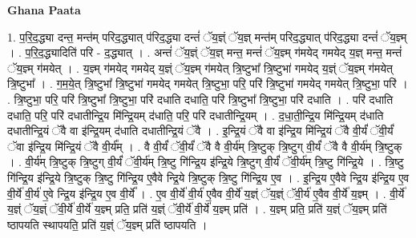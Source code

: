 \documentclass[17pt]{extarticle}
\begin{document}
\textbf{Ghana Paata } \newline

1. प॒रि॒द॒द्ध्या दन्त॒ मन्त॑म् परिद॒द्ध्यात् प॑रिद॒द्ध्या दन्तं॑ ॅय॒ज्ञ्ं ॅय॒ज्ञ् मन्त॑म् परिद॒द्ध्यात् प॑रिद॒द्ध्या दन्तं॑ ॅय॒ज्ञ्म् । . प॒रि॒द॒द्ध्यादिति॑ परि - द॒द्ध्यात् । . अन्तं॑ ॅय॒ज्ञ्ं ॅय॒ज्ञ् मन्त॒ मन्तं॑ ॅय॒ज्ञ्म् ग॑मयेद् गमयेद् य॒ज्ञ् मन्त॒ मन्तं॑ ॅय॒ज्ञ्म् ग॑मयेत् । . य॒ज्ञ्म् ग॑मयेद् गमयेद् य॒ज्ञ्ं ॅय॒ज्ञ्म् ग॑मयेत् त्रि॒ष्टुभा᳚ त्रि॒ष्टुभा॑ गमयेद् य॒ज्ञ्ं ॅय॒ज्ञ्म् ग॑मयेत् त्रि॒ष्टुभा᳚ । . ग॒म॒ये॒त् त्रि॒ष्टुभा᳚ त्रि॒ष्टुभा॑ गमयेद् गमयेत् त्रि॒ष्टुभा॒ परि॒ परि॑ त्रि॒ष्टुभा॑ गमयेद् गमयेत् त्रि॒ष्टुभा॒ परि॑ । . त्रि॒ष्टुभा॒ परि॒ परि॑ त्रि॒ष्टुभा᳚ त्रि॒ष्टुभा॒ परि॑ दधाति दधाति॒ परि॑ त्रि॒ष्टुभा᳚ त्रि॒ष्टुभा॒ परि॑ दधाति । . परि॑ दधाति दधाति॒ परि॒ परि॑ दधातीन्द्रि॒य मि॑न्द्रि॒यम् द॑धाति॒ परि॒ परि॑ दधातीन्द्रि॒यम् । . द॒धा॒ती॒न्द्रि॒य मि॑न्द्रि॒यम् द॑धाति दधातीन्द्रि॒यं ॅवै वा इ॑न्द्रि॒यम् द॑धाति दधातीन्द्रि॒यं ॅवै । . इ॒न्द्रि॒यं ॅवै वा इ॑न्द्रि॒य मि॑न्द्रि॒यं ॅवै वी॒र्यं॑ ॅवी॒र्यं॑ ॅवा इ॑न्द्रि॒य मि॑न्द्रि॒यं ॅवै वी॒र्य᳚म् । . वै वी॒र्यं॑ ॅवी॒र्यं॑ ॅवै वै वी॒र्य॑म् त्रि॒ष्टुक् त्रि॒ष्टुग् वी॒र्यं॑ ॅवै वै वी॒र्य॑म् त्रि॒ष्टुक् । . वी॒र्य॑म् त्रि॒ष्टुक् त्रि॒ष्टुग् वी॒र्यं॑ ॅवी॒र्य॑म् त्रि॒ष्टु गि॑न्द्रि॒य इ॑न्द्रि॒ये त्रि॒ष्टुग् वी॒र्यं॑ ॅवी॒र्य॑म् त्रि॒ष्टु गि॑न्द्रि॒ये । . त्रि॒ष्टु गि॑न्द्रि॒य इ॑न्द्रि॒ये त्रि॒ष्टुक् त्रि॒ष्टु गि॑न्द्रि॒य ए॒वैवे न्द्रि॒ये त्रि॒ष्टुक् त्रि॒ष्टु गि॑न्द्रि॒य ए॒व । . इ॒न्द्रि॒य ए॒वैवे न्द्रि॒य इ॑न्द्रि॒य ए॒व वी॒र्ये॑ वी॒र्य॑ ए॒वे न्द्रि॒य इ॑न्द्रि॒य ए॒व वी॒र्ये᳚ । . ए॒व वी॒र्ये॑ वी॒र्य॑ ए॒वैव वी॒र्ये॑ य॒ज्ञ्ं ॅय॒ज्ञ्ं ॅवी॒र्य॑ ए॒वैव वी॒र्ये॑ य॒ज्ञ्म् । . वी॒र्ये॑ य॒ज्ञ्ं ॅय॒ज्ञ्ं ॅवी॒र्ये॑ वी॒र्ये॑ य॒ज्ञ्म् प्रति॒ प्रति॑ य॒ज्ञ्ं ॅवी॒र्ये॑ वी॒र्ये॑ य॒ज्ञ्म् प्रति॑ । . य॒ज्ञ्म् प्रति॒ प्रति॑ य॒ज्ञ्ं ॅय॒ज्ञ्म् प्रति॑ ष्ठापयति स्थापयति॒ प्रति॑ य॒ज्ञ्ं ॅय॒ज्ञ्म् प्रति॑ ष्ठापयति । \newline
\end{document}
